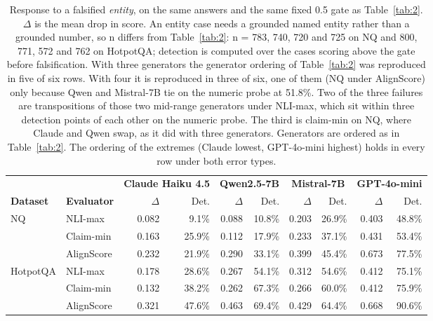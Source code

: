 \begin{table}[t]
\centering
\small
\begin{tabular}{llrrrrrrrr}
\toprule
 & & \multicolumn{2}{c}{\textbf{Claude Haiku 4.5}} & \multicolumn{2}{c}{\textbf{Qwen2.5-7B}} & \multicolumn{2}{c}{\textbf{Mistral-7B}} & \multicolumn{2}{c}{\textbf{GPT-4o-mini}} \\
\cmidrule(lr){3-4}\cmidrule(lr){5-6}\cmidrule(lr){7-8}\cmidrule(lr){9-10}
\textbf{Dataset} & \textbf{Evaluator} & $\Delta$ & Det. & $\Delta$ & Det. & $\Delta$ & Det. & $\Delta$ & Det. \\
\midrule
NQ & NLI-max & 0.082 & 9.1\% & 0.088 & 10.8\% & 0.203 & 26.9\% & 0.403 & 48.8\% \\
 & Claim-min & 0.163 & 25.9\% & 0.112 & 17.9\% & 0.233 & 37.1\% & 0.431 & 53.4\% \\
 & AlignScore & 0.232 & 21.9\% & 0.290 & 33.1\% & 0.399 & 45.4\% & 0.673 & 77.5\% \\
\midrule
HotpotQA & NLI-max & 0.178 & 28.6\% & 0.267 & 54.1\% & 0.312 & 54.6\% & 0.412 & 75.1\% \\
 & Claim-min & 0.132 & 38.2\% & 0.262 & 67.3\% & 0.266 & 60.0\% & 0.412 & 75.9\% \\
 & AlignScore & 0.321 & 47.6\% & 0.463 & 69.4\% & 0.429 & 64.4\% & 0.668 & 90.6\% \\
\bottomrule
\end{tabular}
\caption{Response to a falsified \emph{entity}, on the same answers and the same fixed 0.5 gate as Table~\ref{tab:2}. $\Delta$ is the mean drop in score. An entity case needs a grounded named entity rather than a grounded number, so n differs from Table~\ref{tab:2}: n = 783, 740, 720 and 725 on NQ and 800, 771, 572 and 762 on HotpotQA; detection is computed over the cases scoring above the gate before falsification. With three generators the generator ordering of Table~\ref{tab:2} was reproduced in five of six rows. With four it is reproduced in three of six, one of them (NQ under AlignScore) only because Qwen and Mistral-7B tie on the numeric probe at 51.8\%. Two of the three failures are transpositions of those two mid-range generators under NLI-max, which sit within three detection points of each other on the numeric probe. The third is claim-min on NQ, where Claude and Qwen swap, as it did with three generators. Generators are ordered as in Table~\ref{tab:2}. The ordering of the extremes (Claude lowest, GPT-4o-mini highest) holds in every row under both error types.}
\label{tab:entity}
\end{table}
